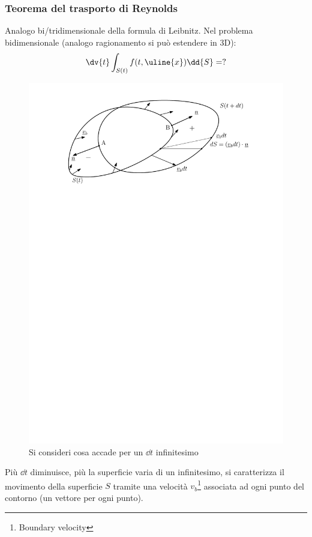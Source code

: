 \subsubsection*{Teorema del trasporto di Reynolds}
Analogo bi/tridimensionale della formula di Leibnitz.
Nel problema bidimensionale (analogo ragionamento si può estendere in 3D):
	\begin{equation*}
		\dv{t} \int_{S(t)} f(t, \uline{x}) \dd{S} = ?
	\end{equation*}
	\begin{figure}[H]
		\includegraphics[scale=0.65]{./Appendice B - Cassetta degli attrezzi/B.2}
		\centering
		\caption{Si consideri cosa accade per un $\dd{t}$ infinitesimo}
	\end{figure}
Più $\dd{t}$ diminuisce, più la superficie varia di un infinitesimo, si caratterizza il movimento della superficie $S$ tramite una velocità $v_b$\footnote{Boundary velocity} associata ad ogni punto del contorno (un vettore per ogni punto).


